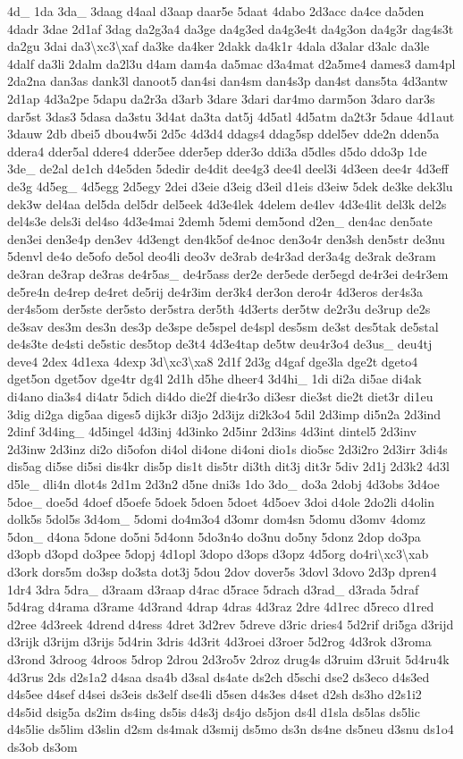 {4d\-\_\- 1da 3da\-\_\- 3daag d4aal d3aap daar5e 5daat 4dabo 2d3acc da4ce da5den 4dadr 3dae 2d1af 3dag da2g3a4 da3ge da4g3ed da4g3e4t da4g3on da4g3r dag4s3t da2gu 3dai da3\textbackslash{}xc3\textbackslash{}xaf da3ke da4ker 2dakk da4k1r 4dala d3alar d3alc da3le 4dalf da3li 2dalm da2l3u d4am dam4a da5mac d3a4mat d2a5me4 dames3 dam4pl 2da2na dan3as dank3l danoot5 dan4si dan4sm dan4s3p dan4st dans5ta 4d3antw 2d1ap 4d3a2pe 5dapu da2r3a d3arb 3dare 3dari dar4mo darm5on 3daro dar3s dar5st 3das3 5dasa da3stu 3d4at da3ta dat5j 4d5atl 4d5atm da2t3r 5daue 4d1aut 3dauw 2db dbei5 dbou4w5i 2d5c 4d3d4 ddags4 ddag5sp ddel5ev dde2n dden5a ddera4 dder5al ddere4 dder5ee dder5ep dder3o ddi3a d5dles d5do ddo3p 1de 3de\-\_\- de2al de1ch d4e5den 5dedir de4dit dee4g3 dee4l deel3i 4d3een dee4r 4d3eff de3g 4d5eg\-\_\- 4d5egg 2d5egy 2dei d3eie d3eig d3eil d1eis d3eiw 5dek de3ke dek3lu dek3w del4aa del5da del5dr del5eek 4d3e4lek 4delem de4lev 4d3e4lit del3k del2s del4s3e dels3i del4so 4d3e4mai 2demh 5demi dem5ond d2en\-\_\- den4ac den5ate den3ei den3e4p den3ev 4d3engt den4k5of de4noc den3o4r den3sh den5str de3nu 5denvl de4o de5ofo de5ol deo4li deo3v de3rab de4r3ad der3a4g de3rak de3ram de3ran de3rap de3ras de4r5as\-\_\- de4r5ass der2e der5ede der5egd de4r3ei de4r3em de5re4n de4rep de4ret de5rij de4r3im der3k4 der3on dero4r 4d3eros der4s3a der4s5om der5ste der5sto der5stra der5th 4d3erts der5tw de2r3u de3rup de2s de3sav des3m des3n des3p de3spe de5spel de4spl des5sm de3st des5tak de5stal de4s3te de4sti de5stic des5top de3t4 4d3e4tap de5tw deu4r3o4 de3us\-\_\- deu4tj deve4 2dex 4d1exa 4dexp 3d\textbackslash{}xc3\textbackslash{}xa8 2d1f 2d3g d4gaf dge3la dge2t dgeto4 dget5on dget5ov dge4tr dg4l 2d1h d5he dheer4 3d4hi\-\_\- 1di di2a di5ae di4ak di4ano dia3s4 di4atr 5dich di4do die2f die4r3o di3esr die3st die2t diet3r di1eu 3dig di2ga dig5aa diges5 dijk3r di3jo 2d3ijz di2k3o4 5dil 2d3imp di5n2a 2d3ind 2dinf 3d4ing\-\_\- 4d5ingel 4d3inj 4d3inko 2d5inr 2d3ins 4d3int dintel5 2d3inv 2d3inw 2d3inz di2o di5ofon di4ol di4one di4oni dio1s dio5sc 2d3i2ro 2d3irr 3di4s dis5ag di5se di5si dis4kr dis5p dis1t dis5tr di3th dit3j dit3r 5div 2d1j 2d3k2 4d3l d5le\-\_\- dli4n dlot4s 2d1m 2d3n2 d5ne dni3s 1do 3do\-\_\- do3a 2dobj 4d3obs 3d4oe 5doe\-\_\- doe5d 4doef d5oefe 5doek 5doen 5doet 4d5oev 3doi d4ole 2do2li d4olin dolk5s 5dol5s 3d4om\-\_\- 5domi do4m3o4 d3omr dom4sn 5domu d3omv 4domz 5don\-\_\- d4ona 5done do5ni 5d4onn 5do3n4o do3nu do5ny 5donz 2dop do3pa d3opb d3opd do3pee 5dopj 4d1opl 3dopo d3ops d3opz 4d5org do4ri\textbackslash{}xc3\textbackslash{}xab d3ork dors5m do3sp do3sta dot3j 5dou 2dov dover5s 3dovl 3dovo 2d3p dpren4 1dr4 3dra 5dra\-\_\- d3raam d3raap d4rac d5race 5drach d3rad\-\_\- d3rada 5draf 5d4rag d4rama d3rame 4d3rand 4drap 4dras 4d3raz 2dre 4d1rec d5reco d1red d2ree 4d3reek 4drend d4ress 4dret 3d2rev 5dreve d3ric dries4 5d2rif dri5ga d3rijd d3rijk d3rijm d3rijs 5d4rin 3dris 4d3rit 4d3roei d3roer 5d2rog 4d3rok d3roma d3rond 3droog 4droos 5drop 2drou 2d3ro5v 2droz drug4s d3ruim d3ruit 5d4ru4k 4d3rus 2ds d2s1a2 d4saa dsa4b d3sal ds4ate ds2ch d5schi dse2 ds3eco d4s3ed d4s5ee d4sef d4sei ds3eis ds3elf dse4li d5sen d4s3es d4set d2sh ds3ho d2s1i2 d4s5id dsig5a ds2im ds4ing ds5is d4s3j ds4jo ds5jon ds4l d1sla ds5las ds5lic d4s5lie ds5lim d3slin d2sm ds4mak d3smij ds5mo ds3n ds4ne ds5neu d3snu ds1o4 ds3ob ds3om }

